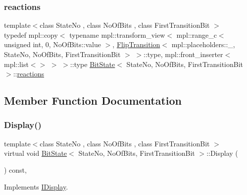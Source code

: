 \subsubsection{\texorpdfstring{reactions}{reactions}\hspace{0.1cm}{\footnotesize\ttfamily [2/2]}}
{\footnotesize\ttfamily template$<$class State\+No , class No\+Of\+Bits , class First\+Transition\+Bit $>$ \\
typedef mpl\+::copy$<$ typename mpl\+::transform\+\_\+view$<$ mpl\+::range\+\_\+c$<$ unsigned int, 0, No\+Of\+Bits\+::value $>$, \mbox{\hyperlink{struct_flip_transition}{Flip\+Transition}}$<$ mpl\+::placeholders\+::\+\_\+, State\+No, No\+Of\+Bits, First\+Transition\+Bit $>$ $>$\+::type, mpl\+::front\+\_\+inserter$<$ mpl\+::list$<$$>$ $>$ $>$\+::type \mbox{\hyperlink{struct_bit_state}{Bit\+State}}$<$ State\+No, No\+Of\+Bits, First\+Transition\+Bit $>$\+::\mbox{\hyperlink{struct_bit_state_a59bd125c7d205880081926b1a6d7689a}{reactions}}}



\subsection{Member Function Documentation}
\mbox{\label{struct_bit_state_a3f26c599cf4a72a263d4fc2c2f7e693d}} 
\subsubsection{\texorpdfstring{Display()}{Display()}}
{\footnotesize\ttfamily template$<$class State\+No , class No\+Of\+Bits , class First\+Transition\+Bit $>$ \\
virtual void \mbox{\hyperlink{struct_bit_state}{Bit\+State}}$<$ State\+No, No\+Of\+Bits, First\+Transition\+Bit $>$\+::Display (\begin{DoxyParamCaption}{ }\end{DoxyParamCaption}) const\hspace{0.3cm}{\ttfamily [inline]}, {\ttfamily [virtual]}}



Implements \mbox{\hyperlink{struct_i_display_a661bdbd2f3b46f7e0d8f8211a212f184}{I\+Display}}.

